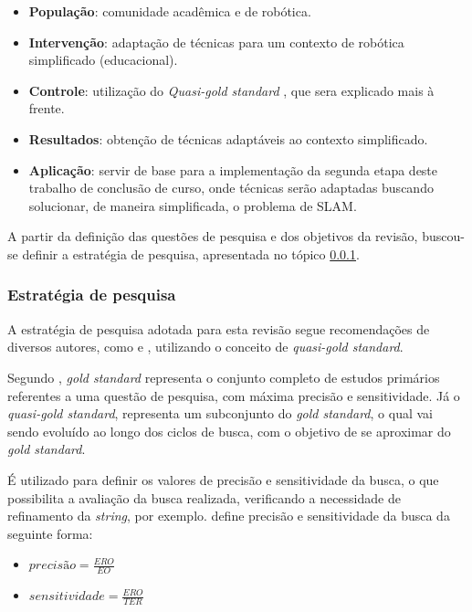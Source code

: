 		\begin{itemize}
			\item \textbf{População}: comunidade acadêmica e de robótica.
			\item \textbf{Intervenção}: adaptação de técnicas para um contexto de robótica simplificado (educacional).
			\item \textbf{Controle}: utilização do \textit{Quasi-gold standard} \cite{Kitchenham}, que sera explicado mais à frente.
			\item \textbf{Resultados}: obtenção de técnicas adaptáveis ao contexto simplificado.
			\item \textbf{Aplicação}: servir de base para a implementação da segunda etapa deste trabalho de conclusão de curso, onde técnicas serão adaptadas buscando solucionar, de maneira simplificada, o problema de SLAM.

		\end{itemize} 

		A partir da definição das questões de pesquisa e dos objetivos da revisão, buscou-se definir a estratégia de pesquisa, apresentada no tópico \ref{sub:estrategias_pesquisa}.

		\subsubsection{Estratégia de pesquisa}
		\label{sub:estrategias_pesquisa}

		A estratégia de pesquisa adotada para esta revisão segue recomendações de diversos autores, como \cite{Kitchenham} e \cite{systematicReviewEngSoft}, utilizando o conceito de \textit{quasi-gold standard}.

		Segundo \cite{quasi_goldES}, \textit{gold standard} representa o conjunto completo de estudos primários referentes a uma questão de pesquisa, com máxima precisão e sensitividade. Já o \textit{quasi-gold standard}, representa um subconjunto do \textit{gold standard}, o qual vai sendo evoluído ao longo dos ciclos de busca, com o objetivo de se aproximar do \textit{gold standard}. 

		É utilizado para definir os valores de precisão e sensitividade da busca, o que possibilita a avaliação da busca realizada, verificando a necessidade de refinamento da \textit{string}, por exemplo. \cite{quasi_goldES} define precisão e sensitividade da busca da seguinte forma:

		\begin{itemize}

			\item $precisão = \frac{ERO}{EO}$ 

			\item $sensitividade = \frac{ERO}{TER}$
		\end{itemize}

